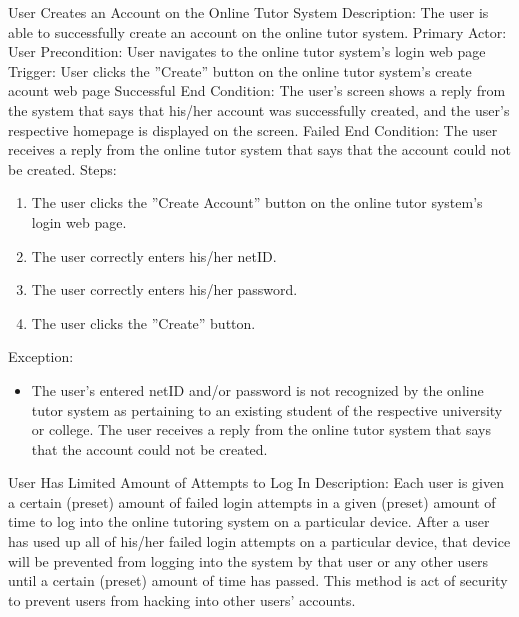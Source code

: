     \begin{section}{User Creates an Account on the Online Tutor System}
        Description: The user is able to successfully create an account on the online tutor system. \newline
        Primary Actor: User \newline
        Precondition: User navigates to the online tutor system's login web page \newline
        Trigger: User clicks the ''Create'' button on the online tutor system's create acount web page \newline
        Successful End Condition: The user's screen shows a reply from the system that says that his/her account was 
        successfully created, and the user's respective homepage is displayed on the screen. \newline
        Failed End Condition: The user receives a reply from the online tutor system that says that the account could not be created. \newline
         \newline
        Steps:
        \begin{enumerate}
            \item{The user clicks the ''Create Account'' button on the online tutor system's login web page.}
            \item{The user correctly enters his/her netID.}
            \item{The user correctly enters his/her password.}
            \item{The user clicks the ''Create'' button.}
        \end{enumerate}
        Exception:
        \begin{itemize}
            \item{The user's entered netID and/or password is not recognized by the online tutor system as pertaining to an existing student of the respective university or college. 
            The user receives a reply from the online tutor system that says that the account could not be created.}
        \end{itemize}
\end{section}
    
    \begin{section}{User Has Limited Amount of Attempts to Log In}
        Description: Each user is given a certain (preset) amount of failed login attempts 
        in a given (preset) amount of time to log into the online tutoring system on a particular device.  
        After a user has used up all of his/her failed login attempts on a particular device, 
        that device will be prevented from logging into the system by that user or any other users 
        until a certain (preset) amount of time has passed.  This method is act of security to prevent 
        users from hacking into other users' accounts.
    \end{section}









